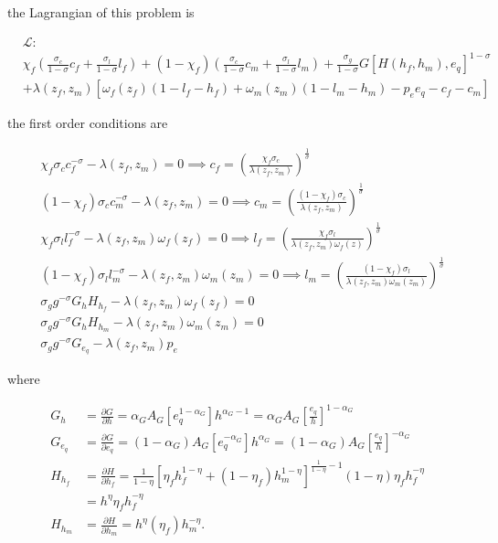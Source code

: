 \documentclass[12pt]{article}
\begin{document}
the Lagrangian of this problem is

\begin{align*}
	& \mathcal{L} : \\ &\chi_f\left(\frac{\sigma_c}{1-\sigma}c_f+\frac{\sigma_l}{1-\sigma}l_f\right)+\left(1-\chi_f\right)\left(\frac{\sigma_c}{1-\sigma}c_m+\frac{\sigma_l}{1-\sigma}l_m\right)+\frac{\sigma_g}{1-\sigma}G\left[H\left(h_f,h_m\right),e_q\right]^{1-\sigma} \\
	& +\lambda(z_f,z_m)\left[\omega_f(z_f)\left(1-l_f-h_f\right)+\omega_m(z_m)\left(1-l_m-h_m\right)-p_e e_q-c_f-c_m\right]
\end{align*}

the first order conditions are

\begin{align}
& \chi_f \sigma_c c_f^{-\sigma}-\lambda(z_f,z_m) = 0 \implies c_f=\left(\frac{\chi_f \sigma_c}{\lambda(z_f,z_m)}\right)^{\frac{1}{\sigma}} \tag{MFOC 1} \label{MFOC1} \\
& \left(1-\chi_f\right)\sigma_c c_m^{-\sigma}-\lambda(z_f,z_m) = 0 \implies c_m=\left(\frac{\left(1-\chi_f\right)\sigma_c}{\lambda(z_f,z_m)}\right)^{\frac{1}{\sigma}} \tag{MFOC 2} \label{MFOC2} \\
& \chi_f\sigma_l l_f^{-\sigma}-\lambda(z_f,z_m)\omega_f(z_f) = 0 \implies l_f=\left(\frac{\chi_f\sigma_l}{\lambda(z_f,z_m)\omega_f(z)}\right)^{\frac{1}{\sigma}} \tag{MFOC 3} \label{MFOC3} \\
& \left(1-\chi_f\right)\sigma_l l_m^{-\sigma}-\lambda(z_f,z_m)\omega_m(z_m) = 0 \implies l_m=\left(\frac{\left(1-\chi_f\right)\sigma_l}{\lambda(z_f,z_m)\omega_m(z_m)}\right)^{\frac{1}{\sigma}} \tag{MFOC 4} \label{MFOC4} \\
& \sigma_g g^{-\sigma}G_h H_{h_f}-\lambda(z_f,z_m)\omega_f(z_f) = 0 \tag{MFOC 5} \label{MFOC5} \\
& \sigma_g g^{-\sigma}G_h H_{h_m}-\lambda(z_f,z_m)\omega_m(z_m) = 0 \tag{MFOC 6} \label{MFOC6} \\
& \sigma_g g^{-\sigma}G_{e_q}-\lambda(z_f,z_m) p_e \tag{MFOC 7} \label{MFOC7}
\end{align}

where

\begin{align*}
	G_h &= \frac{\partial G}{\partial h} = \alpha_G A_G\left[e_q^{1-\alpha_G}\right]h^{\alpha_G-1} = \alpha_G A_G \left[\frac{e_q}{h}\right]^{1-\alpha_G} \\
	G_{e_q} &= \frac{\partial G}{\partial e_q} = \left(1-\alpha_G\right) A_G\left[e_q^{-\alpha_G}\right]h^{\alpha_G} = \left(1-\alpha_G\right) A_G \left[\frac{e_q}{h}\right]^{-\alpha_G} \\
	H_{h_f} &=\frac{\partial H}{\partial h_f}=\frac{1}{1-\eta}\left[\eta_f h_f^{1-\eta}+\left(1-\eta_f\right)h_m^{1-\eta}\right]^{\frac{1}{1-\eta}-1}\left(1-\eta\right)\eta_f h_f^{-\eta} \\
	& = h^{\eta}\eta_f h_f^{-\eta} \\
	H_{h_m} &=\frac{\partial H}{\partial h_m} = h^{\eta}\left(\eta_f\right)h_m^{-\eta}.
\end{align*}
\end{document}

